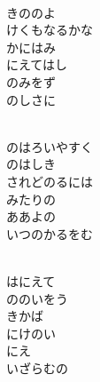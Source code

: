 \documentclass[10pt,b5j]{tarticle} %
\begin{document}
\vspace{1.5em} %
\newcommand{\linespace}{0.5em} %
\newcommand{\blocksize}{0.5\hsize} %
\newcommand{\itemmargin}{6em} %
\begin{enumerate} %
    \setlength{\itemindent}{\itemmargin} %
    \begin{minipage}[c]{\blocksize}
    
        \vspace{\linespace}
        \item~\\
        きののよ\\
        けくもなるかな\\
        かにはみ\\
        にえてはし\\
        のみをず\\
        のしさに
        
        \vspace{\linespace}
        \item~\\
        のはろいやすく\\
        のはしき\\
        されどのるには\\
        みたりの\\
        ああよの\\
        いつのかるをむ
        
        \vspace{\linespace}
        \item~\\
        はにえて\\
        ののいをう\\
        きかば\\
        にけのい\\
        にえ\\
        いざらむの
        

\end{minipage}
\end{enumerate}
\end{document}
